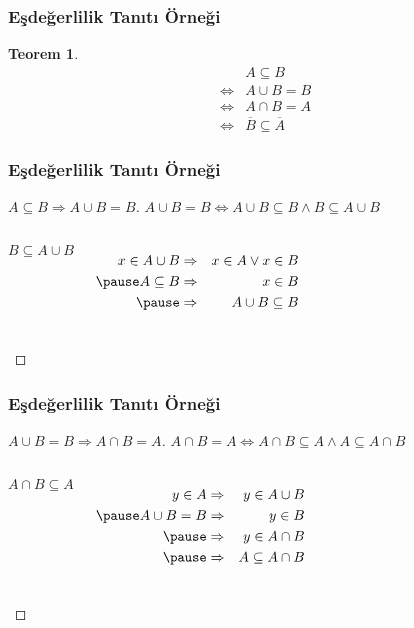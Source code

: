 \documentclass[dvipsnames]{beamer}
\theoremstyle{definition}
\theoremstyle{example}
\theoremstyle{plain}
\newtheorem{teorem}[theorem]{Teorem}
\begin{document}
\begin{frame}
  \frametitle{Eşdeğerlilik Tanıtı Örneği}

  \begin{teorem}
    \begin{eqnarray*}
      &                 & A \subseteq B\\
      & \Leftrightarrow & A \cup B = B\\
      & \Leftrightarrow & A \cap B = A\\
      & \Leftrightarrow & \overline{B} \subseteq \overline{A}
    \end{eqnarray*}
  \end{teorem}
\end{frame}

\begin{frame}
  \frametitle{Eşdeğerlilik Tanıtı Örneği}

  \begin{proof}[$A \subseteq B \Rightarrow A \cup B = B$]
    $A \cup B = B \Leftrightarrow
      A \cup B \subseteq B \wedge B \subseteq A \cup B$

    \pause
    \bigskip
    \begin{columns}
      $B \subseteq A \cup B$

      \pause
      \medskip
      \begin{eqnarray*}
        x \in A \cup B & \Rightarrow & x \in A \vee x \in B\\\pause
        A \subseteq B  & \Rightarrow & x \in B\\\pause
                       & \Rightarrow & A \cup B \subseteq B
      \end{eqnarray*}
    \end{columns}
  \end{proof}
\end{frame}

\begin{frame}
  \frametitle{Eşdeğerlilik Tanıtı Örneği}

  \begin{proof}[$A \cup B = B \Rightarrow A \cap B = A$]
    $A \cap B = A \Leftrightarrow
      A \cap B \subseteq A \wedge A \subseteq A \cap B$

    \pause
    \bigskip
    \begin{columns}
      $A \cap B \subseteq A$

      \pause
      \medskip
      \begin{eqnarray*}
        y \in A      & \Rightarrow & y \in A \cup B\\\pause
        A \cup B = B & \Rightarrow & y \in B\\\pause
                     & \Rightarrow & y \in A \cap B\\\pause
                     & \Rightarrow & A \subseteq A \cap B
      \end{eqnarray*}
    \end{columns}
  \end{proof}
\end{frame}
\end{document}

